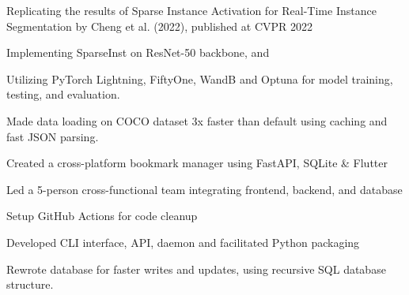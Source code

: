 \documentclass[]{resume-template}
\begin{document}
\begin{minipage}[t]{0.66\textwidth}
  \label{subsec:neatbot}
  \begin{tightemize}
  \item Replicating the results of Sparse Instance Activation for Real-Time Instance Segmentation by Cheng et al. (2022), published at CVPR 2022
  \item Implementing SparseInst on ResNet-50 backbone, and
  \item Utilizing PyTorch Lightning, FiftyOne, WandB and Optuna for model training, testing, and evaluation.
  \item Made data loading on COCO dataset 3x faster than default using caching and fast JSON parsing.

  \end{tightemize}
  \label{subsec: Bookie}
  \begin{tightemize}
  \item Created a cross-platform bookmark manager using FastAPI, SQLite \& Flutter
  \item Led a 5-person cross-functional team integrating frontend, backend, and database
  \item Setup GitHub Actions for code cleanup
  \item Developed CLI interface, API, daemon and facilitated Python packaging
  \item Rewrote database for faster writes and updates, using recursive SQL database structure. \\
  \end{tightemize}


\end{minipage}
\end{document}
